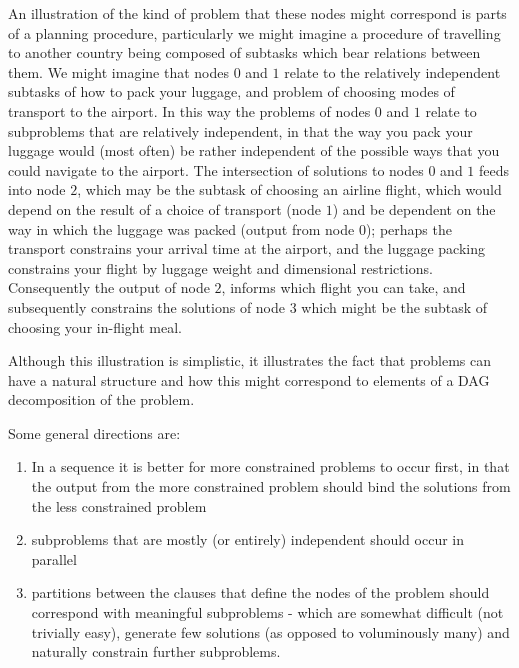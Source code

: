 \documentclass[
10pt, %
a4paper, %
oneside, %
headinclude,footinclude, %
BCOR5mm, %
]{scrartcl}
\begin{document}
An illustration of the kind of problem that these nodes might correspond is parts of a planning procedure, particularly we might imagine a procedure of travelling to another country being
composed of subtasks which bear relations between them.
We might imagine that nodes $0$ and $1$ relate to the relatively independent subtasks of how to pack your luggage, and problem of choosing modes of transport to the airport.
In this way the problems of nodes $0$ and $1$ relate to subproblems that are relatively independent, in that the way you pack your luggage would (most often) be rather independent of the possible
ways that you could navigate to the airport.
The intersection of solutions to nodes $0$ and $1$ feeds into node $2$, which may be the subtask of choosing an airline flight, which would depend on the result of a choice of transport (node $1$) and
be dependent on the way in which the luggage was packed (output from node $0$); perhaps the transport constrains your arrival time at the airport, and the luggage packing constrains your flight by
luggage weight and dimensional restrictions.
Consequently the output of node $2$, informs which flight you can take, and subsequently constrains the solutions of node $3$ which might be the subtask of choosing your in-flight meal.

Although this illustration is simplistic, it illustrates the fact that problems can have a natural structure and how this might correspond to elements of a DAG decomposition of the problem.

Some general directions are:
\begin{enumerate}
\item	In a sequence it is better for more constrained problems to occur first, in that the output from the more constrained problem should bind the solutions from the less constrained problem
\item	subproblems that are mostly (or entirely) independent should occur in parallel
\item	partitions between the clauses that define the nodes of the problem should correspond with meaningful subproblems - 
which are somewhat difficult (not trivially easy), generate few solutions (as opposed to voluminously many) and naturally constrain further subproblems.
\end{enumerate}
\end{document}
